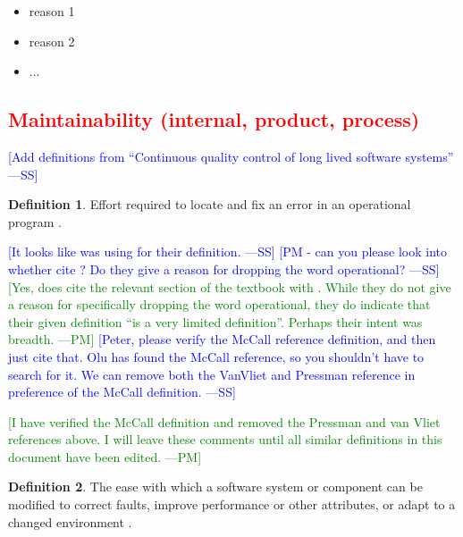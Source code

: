 \documentclass[letterpaper, cleveref]{lipics-v2019}
\newcommand{\authornote}[3]{\textcolor{#1}{[#3 ---#2]}}
\newcommand{\authornote}[3]{}
\newcommand{\wss}[1]{\authornote{blue}{SS}{#1}} %
\newcommand{\pmi}[1]{\authornote{green}{PM}{#1}} %
\newcommand{\notdone}[1]{\textcolor{red}{#1}}
\theoremstyle{definition}
\newtheorem{defn}{Definition}
\begin{document}
\begin{itemize}
  \item reason 1
  \item reason 2
  \item ...
\end{itemize}


\subsection{\notdone{Maintainability (internal, product, process)}} %

\wss{Add definitions from ``Continuous quality control of long lived software systems''}

\begin{defn}
  Effort required to locate and fix an error in an operational program
  \citep{McCallEtAl1977}.

  \wss{It looks like \citet{pressman2005software} was using
  \citet{McCallEtAl1977} for their definition.} \wss{PM - can you please
  look into whether \citet{pressman2005software} cite
  \citet{McCallEtAl1977}?  Do they give a reason for dropping the word
  operational?}  \pmi{Yes, \citet{pressman2005software} does cite the
  relevant section of the textbook with \citet{McCallEtAl1977}. While they
  do not give a reason for specifically dropping the word operational, they
  do indicate that their given definition ``is a very limited definition''.
  Perhaps their intent was breadth.} \wss{Peter, please verify the McCall
  reference definition, and then just cite that.  Olu has found the McCall
  reference, so you shouldn't have to search for it.  We can remove both the
  VanVliet and Pressman reference in preference of the McCall definition.}

  \pmi{I have verified the McCall definition and removed the Pressman and
  van Vliet references above. I will leave these comments until all similar
  definitions in this document have been edited.}
\end{defn}

\begin{defn} \label{MaintainabilityDefnSelected1} 
  The ease with which a software system or component can be modified to correct
  faults, improve performance or other attributes, or adapt to a changed
  environment \citep{IEEEStdGlossarySET1990}.
\end{defn}
\end{document}

